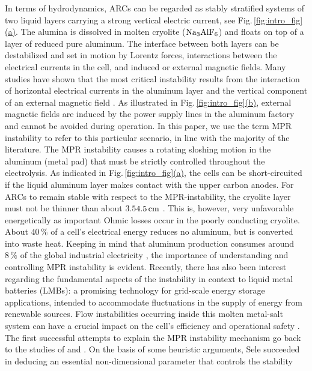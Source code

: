 \documentclass[aps,prfluids,reprint,superscriptaddress]{revtex4-2}
\begin{document}
In terms of hydrodynamics, ARCs can be regarded as stably stratified systems of two liquid layers carrying a strong vertical electric current, see Fig.\,\ref{fig:intro_fig}\hyperref[fig:intro_fig]{(a)}. The alumina is dissolved in molten cryolite (${\rm Na}_3{\rm Al}{\rm F}_6$) and floats  on top of a layer of reduced pure aluminum. The interface between both layers can be destabilized and set in motion by Lorentz forces, interactions between the electrical currents in the cell, and induced or external magnetic fields. Many studies have shown that the most critical instability results from the interaction of horizontal electrical  currents in the aluminum layer and the vertical component of an external magnetic field \cite[chapter~6.1]{gerbeau2006a}. As illustrated in Fig.\,\ref{fig:intro_fig}\hyperref[fig:intro_fig]{(b)}, external  magnetic fields are induced  by the power supply lines in the aluminum factory and cannot be avoided during operation. In this paper, we use the term MPR instability to refer to this particular scenario, in line with the majority of the literature. The MPR instability causes a rotating sloshing motion in the aluminum (metal pad) that must be strictly controlled throughout the electrolysis. As indicated in Fig.\,\ref{fig:intro_fig}\hyperref[fig:intro_fig]{(a)}, the cells can be short-circuited if the liquid aluminum layer makes contact with the upper carbon anodes. For ARCs to remain stable with respect to the MPR-instability, the cryolite layer must not be thinner than about $3.5$\textendash$4.5\,{\rm cm}$ \cite{seetharaman2024}. This is, however, very unfavorable energetically as important Ohmic losses occur in the poorly conducting cryolite. About $40\,\%$ of a cell’s electrical energy reduces no aluminum, but is converted into waste heat. Keeping in mind that aluminum production consumes around $8\,\%$ of the global industrial electricity \cite{Kermeli2015}, the importance of understanding and controlling MPR instability is evident. Recently, there has also been interest regarding the fundamental aspects of the instability in context to liquid metal batteries (LMBs): a promising technology for grid-scale energy storage applications, intended to accommodate fluctuations in the supply of energy from renewable sources. Flow instabilities occurring inside this molten metal-salt system can have a crucial impact on the cell’s efficiency and operational safety \cite{Kelley2018,Horstmann2018,Duczek2024}. 
\\
\indent The first successful attempts to explain the MPR instability mechanism go back to the studies of \citet{Urata1985} and \citet{Sele1977}. On the basis of some heuristic arguments, Sele succeeded in deducing an essential non-dimensional parameter that controls the stability
\end{document}

